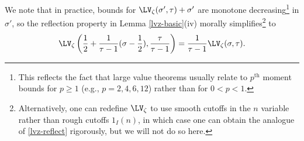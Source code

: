 
We note that in practice, bounds for $\LV_\zeta(\sigma',\tau)+\sigma'$ are monotone decreasing\footnote{This reflects the fact that large value theorems usually relate to $p^{\mathrm{th}}$ moment bounds for $p \geq 1$ (e.g., $p = 2, 4, 6, 12$) rather than for $0 < p < 1$.} in $\sigma'$, so the reflection property in Lemma \ref{lvz-basic}(iv) morally simplifies\footnote{Alternatively, one can redefine $\LV_\zeta$ to use smooth cutoffs in the $n$ variable rather than rough cutoffs $1_I(n)$, in which case one can obtain the analogue of \eqref{lvz-reflect} rigorously, but we will not do so here.} to
\begin{equation}\label{lvz-reflect}
    \LV_\zeta\left(\frac{1}{2} + \frac{1}{\tau-1} (\sigma-\frac{1}{2}), \frac{\tau}{\tau-1}\right) = \frac{1}{\tau-1} \LV_\zeta(\sigma,\tau).
\end{equation}


